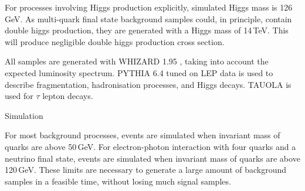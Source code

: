 For processes involving Higgs production explicitly, simulated Higgs mass is 126\,GeV.
As multi-quark final state background samples could, in principle, contain double higgs production, they are generated with a Higgs mass of 14\,TeV. This will produce negligible double higgs production cross section.






All samples are generated with WHIZARD 1.95 \cite{}, taking into account the expected \CLIC luminosity spectrum.
PYTHIA 6.4 \cite{} tuned on LEP data \cite{} is used to describe fragmentation, hadronisation processes, and Higgs decays. TAUOLA \cite{} is used for $\tau$ lepton decays.

Simulation

For most background processes, events are simulated when invariant mass of quarks are above 50\,GeV. For electron-photon interaction with four quarks and a neutrino final state, events are simulated when invariant mass of quarks are above 120\,GeV. These limits are necessary to generate a large amount of background samples in a feasible time, without losing much signal samples.

